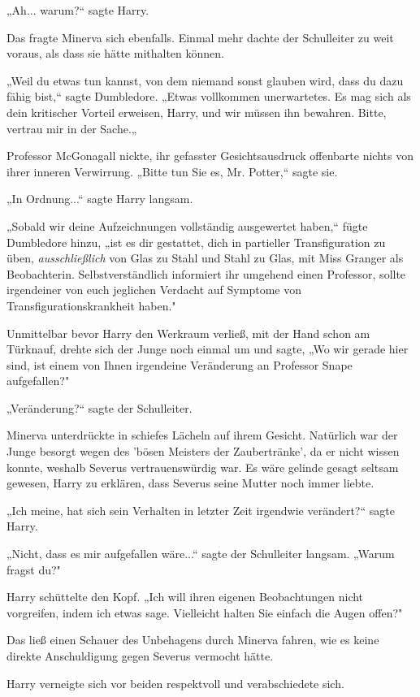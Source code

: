 {„Ah... warum?“ sagte Harry.

Das fragte Minerva sich ebenfalls. Einmal mehr dachte der Schulleiter zu weit voraus, als dass sie hätte mithalten können.

„Weil du etwas tun kannst, von dem niemand sonst glauben wird, dass du dazu fähig bist,“ sagte Dumbledore. „Etwas vollkommen unerwartetes. Es mag sich als dein kritischer Vorteil erweisen, Harry, und wir müssen ihn bewahren. Bitte, vertrau mir in der Sache.„

Professor McGonagall nickte, ihr gefasster Gesichtsausdruck offenbarte nichts von ihrer inneren Verwirrung. „Bitte tun Sie es, Mr. Potter,“ sagte sie.

„In Ordnung...“ sagte Harry langsam.

„Sobald wir deine Aufzeichnungen vollständig ausgewertet haben,“ fügte Dumbledore hinzu, „ist es dir gestattet, dich in partieller Transfiguration zu üben, \emph{ausschließlich} von Glas zu Stahl und Stahl zu Glas, mit Miss Granger als Beobachterin. Selbstverständlich informiert ihr umgehend einen Professor, sollte irgendeiner von euch jeglichen Verdacht auf Symptome von Transfigurationskrankheit haben."

Unmittelbar bevor Harry den Werkraum verließ, mit der Hand schon am Türknauf, drehte sich der Junge noch einmal um und sagte, „Wo wir gerade hier sind, ist einem von Ihnen irgendeine Veränderung an Professor Snape aufgefallen?"

„Veränderung?“ sagte der Schulleiter.

Minerva unterdrückte in schiefes Lächeln auf ihrem Gesicht. Natürlich war der Junge besorgt wegen des 'bösen Meisters der Zaubertränke', da er nicht wissen konnte, weshalb Severus vertrauenswürdig war. Es wäre gelinde gesagt seltsam gewesen, Harry zu erklären, dass Severus seine Mutter noch immer liebte.

„Ich meine, hat sich sein Verhalten in letzter Zeit irgendwie verändert?“ sagte Harry.

„Nicht, dass es mir aufgefallen wäre...“ sagte der Schulleiter langsam. „Warum fragst du?"

Harry schüttelte den Kopf. „Ich will ihren eigenen Beobachtungen nicht vorgreifen, indem ich etwas sage. Vielleicht halten Sie einfach die Augen offen?"

Das ließ einen Schauer des Unbehagens durch Minerva fahren, wie es keine direkte Anschuldigung gegen Severus vermocht hätte.

Harry verneigte sich vor beiden respektvoll und verabschiedete sich.

}
